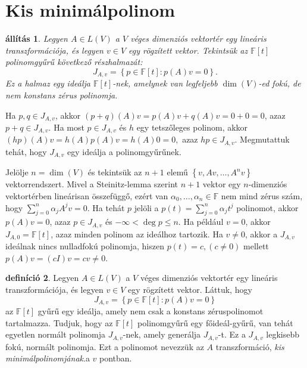 \documentclass[9pt, a4paper, showtrims]{memoir}
\makeatletter
\renewenvironment{proof}[1][\proofname]
    {\par\pushQED{\qed}%
    \normalfont \topsep6\p@\@plus6\p@\relax
    \trivlist
    \item[\hskip\labelsep
        \itshape
    #1\@addpunct{:}]\ignorespaces}
    {\popQED\endtrivlist\@endpefalse}
\theoremstyle{plain}
\newtheorem{proposition}{állítás}[chapter]
\theoremstyle{remark}
\theoremstyle{definition}
\newtheorem{definition}[proposition]{definíció}
\makeatother
\begin{document}
\section{Kis minimálpolinom}
\begin{proposition}
	Legyen $A\in L\left( V \right)$ a $V$ véges dimenziós vektortér egy lineáris transzformációja,
	és legyen $v\in V$ egy rögzített vektor.
	Tekintsük az
	$\mathbb{F}\left[ t \right]$ polinomgyűrű következő részhalmazát:
	\[
		J_{A,v}
		=
		\left\{ p\in\mathbb{F}\left[ t \right]:p\left( A \right)v=0 \right\}.
	\]
	Ez a halmaz egy ideálja $\mathbb{F}\left[ t \right]$-nek,
	amelynek van legfeljebb $\dim(V)$-ed fokú, de nem konstans zérus polinomja.
\end{proposition}
\begin{proof}
	Ha $p,q\in J_{A,v}$,
	akkor
	$\left( p+q \right)(A)v=p\left( A \right)v+q\left( A \right)v=0+0=0$,
	azaz $p+q\in J_{A,v}$.
	Ha most $p\in J_{A,v}$ és $h$ egy tetszőleges polinom,
	akkor
	$
		\left( hp \right)(A)v=h\left( A \right)p\left( A \right)v=h\left( A \right)0=0,
	$
	azaz $hp\in J_{A,v}$.
	Megmutattuk tehát, hogy $J_{A,v}$ egy ideálja a polinomgyűrűnek.

	Jelölje $n=\dim(V)$ és tekintsük az $n+1$ elemű
	$\left\{ v,Av,\ldots,A^nv \right\}$ vektorrendszert.
	Mivel a Steinitz-lemma szerint 
	$n+1$ vektor egy $n$-dimenziós vektortérben lineárisan összefüggő,
	ezért van
	$\alpha_0,\ldots,\alpha_n\in\mathbb{F}$ nem mind zérus szám, hogy
	$\sum_{j=0}^n\alpha_jA^jv=0$.
	Ha tehát $p$ jelöli a $p\left( t \right)=\sum_{j=0}^n\alpha_jt^j$ polinomot,
	akkor
	$p\left( A \right)v=0$, azaz $p\in J_{A,v}$ és $-\infty<\deg p\leq n$.
\end{proof}
Ha például $v=0$, akkor $J_{A,0}=\mathbb{F}\left[ t \right]$, azaz minden polinom
az ideálhoz tartozik.
Ha $v\neq 0$,
akkor a $J_{A,v}$ ideálnak nincs nulladfokú polinomja,
hiszen $p(t)=c, (c\neq 0)$ mellett
$p\left( A \right)v=(cI)v=cv\neq 0$.

\begin{definition}
	Legyen $A\in L\left( V \right)$ a $V$ véges dimenziós vektortér egy lineáris transzformációja,
	és legyen $v\in V$ egy rögzített vektor.
	Láttuk, hogy
	\[
		J_{A,v}
		=
		\left\{ p\in\mathbb{F}\left[ t \right]:p\left( A \right)v=0 \right\}
	\]
	az $\mathbb{F}\left[ t \right]$ gyűrű egy ideálja, amely nem csak a konstans zéruspolinomot tartalmazza.
	Tudjuk, hogy az $\mathbb{F}\left[ t \right]$ polinomgyűrű egy főideál-gyűrű,
	van tehát egyetlen normált polinomja $J_{A,v}$-nek, amely generálja $J_{A,v}$-t.
	Ez a $J_{A,v}$ legkisebb fokú, normált polinomja.
	Ezt a polinomot nevezzük az $A$ transzformáció, 
    \emph{kis minimálpolinomjának}.\label{def:kisminimal}
    a $v$ pontban.
\end{definition}
\end{document}
